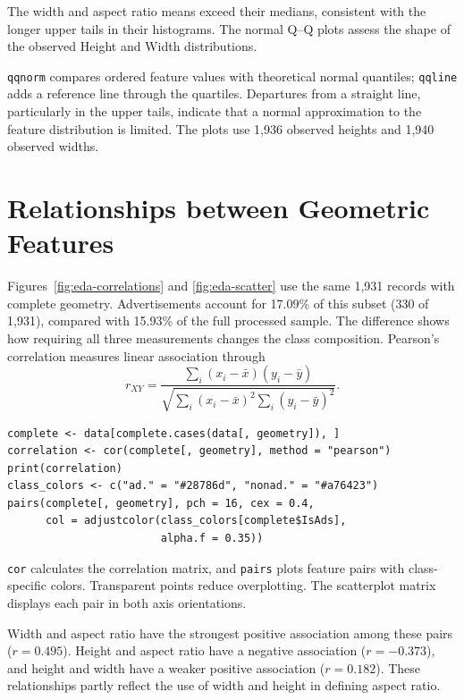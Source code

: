 The width and aspect ratio means exceed their medians, consistent
with the longer upper tails in their histograms. The normal Q--Q plots
assess the shape of the observed Height and Width distributions.

\texttt{qqnorm} compares ordered feature values with theoretical normal
quantiles; \texttt{qqline} adds a reference line through the quartiles.
Departures from a straight line, particularly in the upper tails, indicate
that a normal approximation to the feature distribution is limited.
The plots use 1,936 observed heights and 1,940 observed widths.

\section{Relationships between Geometric Features}

Figures~\ref{fig:eda-correlations} and \ref{fig:eda-scatter} use the
same 1,931 records with complete geometry. Advertisements account for
17.09\% of this subset (330 of 1,931), compared with 15.93\% of the
full processed sample. The difference shows how requiring all three
measurements changes the class composition.
Pearson's correlation measures linear association through
\[
 r_{XY}=\frac{\sum_i(x_i-\bar{x})(y_i-\bar{y})}
 {\sqrt{\sum_i(x_i-\bar{x})^2\sum_i(y_i-\bar{y})^2}}.
\]
\begin{lstlisting}[style=edaR]
complete <- data[complete.cases(data[, geometry]), ]
correlation <- cor(complete[, geometry], method = "pearson")
print(correlation)
class_colors <- c("ad." = "#28786d", "nonad." = "#a76423")
pairs(complete[, geometry], pch = 16, cex = 0.4,
      col = adjustcolor(class_colors[complete$IsAds],
                        alpha.f = 0.35))
\end{lstlisting}

\texttt{cor} calculates the correlation matrix, and \texttt{pairs}
plots feature pairs with class-specific colors. Transparent points reduce
overplotting. The scatterplot matrix displays each pair in both axis
orientations.

Width and aspect ratio have the strongest positive association among
these pairs (\(r=0.495\)). Height and aspect ratio have a negative
association (\(r=-0.373\)), and height and width have a weaker positive
association (\(r=0.182\)). These relationships partly reflect the use of
width and height in defining aspect ratio.

